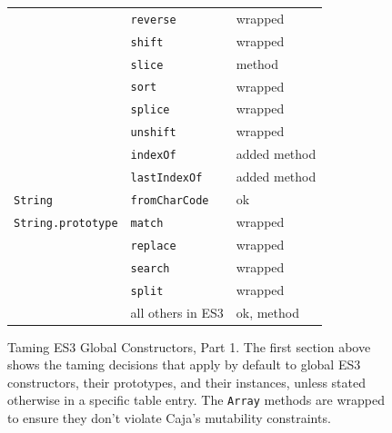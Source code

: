 \documentclass[letterpaper,twocolumn,10pt]{article}
\newcommand{\code}[1]{{\tt {#1}}}              %
\begin{document}
\begin{figure}
\begin{tabular}{lll}
                                 & \code{reverse}              & wrapped \\
                                 & \code{shift}                & wrapped \\
                                 & \code{slice}                & method \\
                                 & \code{sort}                 & wrapped \\
                                 & \code{splice}               & wrapped \\
                                 & \code{unshift}              & wrapped \\
                                 & \code{indexOf}              & added method \\
                                 & \code{lastIndexOf}          & added method \\
  \hline
  \code{String}                  & \code{fromCharCode}         & ok \\
  \code{String.prototype}        & \code{match}                & wrapped \\
                                 & \code{replace}              & wrapped \\
                                 & \code{search}               & wrapped \\
                                 & \code{split}                & wrapped \\
                                 &           all others in ES3 & ok, method \\
\end{tabular}

\caption[Taming ES3 Global Constructors, Part 1.]{Taming ES3 Global
Constructors, Part 1. The first section above shows the taming
decisions that apply by default to global ES3 constructors, their prototypes,
and their instances, unless stated otherwise in a specific table entry. The
\code{Array} methods are wrapped to ensure they don't violate Caja's
mutability constraints.}
\label{tab:taming-es3-1}
\end{figure}
\end{document}
